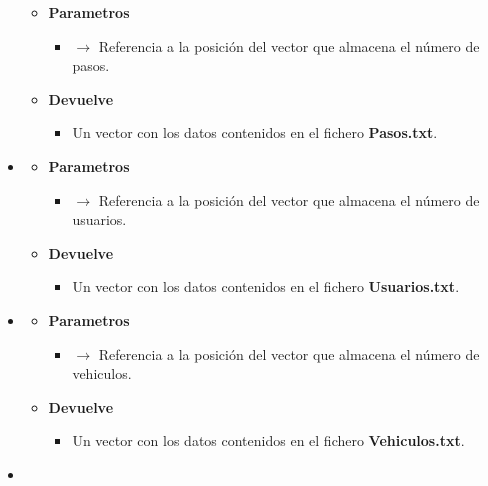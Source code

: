 \begin{itemize}
\begin{itemize}
		\item \textbf{Parametros}
		\begin{itemize}
			\item {} $\rightarrow$ Referencia a la posición del vector que almacena el número de pasos.
		\end{itemize}
		\item \textbf{Devuelve}
		\begin{itemize}
			\item Un vector con los datos contenidos en el fichero \textbf{Pasos.txt}.
		\end{itemize}
	\end{itemize}
	\newpage
	\item\label{def:initusuarios}
	\begin{itemize}
		\item \textbf{Parametros}
		\begin{itemize}
			\item {} $\rightarrow$ Referencia a la posición del vector que almacena el número de usuarios.
		\end{itemize}
		\item \textbf{Devuelve}
		\begin{itemize}
			\item Un vector con los datos contenidos en el fichero \textbf{Usuarios.txt}.
		\end{itemize}
	\end{itemize}
	\item\label{def:initvehiculos}
	\begin{itemize}
		\item \textbf{Parametros}
		\begin{itemize}
			\item {} $\rightarrow$ Referencia a la posición del vector que almacena el número de vehiculos.
		\end{itemize}
		\item \textbf{Devuelve}
		\begin{itemize}
			\item Un vector con los datos contenidos en el fichero \textbf{Vehiculos.txt}.
		\end{itemize}
	\end{itemize}
	\item\label{def:initviajes}
	\begin{itemize}

\end{itemize}
\end{itemize}
